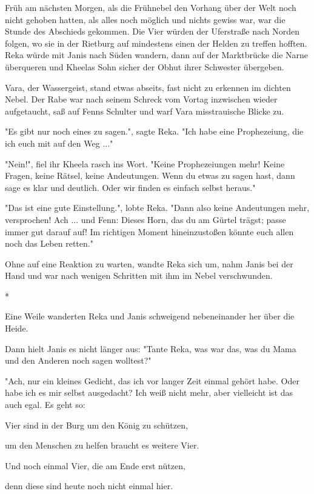\documentclass[10pt, a4paper, oneside]{book}
\begin{document}
\begin{multicols}{2}
Früh am nächsten Morgen, als die Frühnebel den Vorhang über der Welt noch 
nicht gehoben hatten, als alles noch möglich und nichts gewiss war, war die Stunde des Abschieds gekommen. Die Vier würden der Uferstraße nach Norden folgen, wo sie in der Rietburg auf mindestens einen der Helden zu treffen hofften. Reka würde mit Janis nach Süden wandern, dann auf der Marktbrücke die Narne überqueren und Kheelas Sohn sicher der Obhut ihrer Schwester übergeben. 

Vara, der Wassergeist, stand etwas abseits, fast nicht zu erkennen im dichten Nebel. Der Rabe war nach seinem Schreck vom Vortag inzwischen wieder aufgetaucht, saß auf Fenns Schulter und warf Vara misstrauische Blicke zu. 

"Es gibt nur noch eines zu sagen.", sagte Reka. "Ich habe eine Prophezeiung, die ich euch mit auf den Weg ..." 

"Nein!", fiel ihr Kheela rasch ins Wort. "Keine Prophezeiungen mehr! Keine Fragen, keine Rätsel, keine Andeutungen. Wenn du etwas zu sagen hast, dann sage es klar und deutlich. Oder wir finden es einfach selbst heraus." 

"Das ist eine gute Einstellung.", lobte Reka. "Dann also keine Andeutungen mehr, versprochen! Ach ... und Fenn: Dieses Horn, das du am Gürtel trägst; passe immer gut darauf auf! Im richtigen Moment hineinzustoßen könnte euch allen noch das Leben retten." 

Ohne auf eine Reaktion zu warten, wandte Reka sich um, nahm Janis bei der Hand und war nach wenigen Schritten mit ihm im Nebel verschwunden. 

\begin{center}
    * 
\end{center}

Eine Weile wanderten Reka und Janis schweigend nebeneinander her über die 
Heide.

Dann hielt Janis es nicht länger aus: "Tante Reka, was war das, was du Mama 
und den Anderen noch sagen wolltest?" 

"Ach, nur ein kleines Gedicht, das ich vor langer Zeit einmal gehört habe. Oder habe ich es mir selbst ausgedacht? Ich weiß nicht mehr, aber vielleicht ist das auch egal. Es geht so: 

Vier sind in der Burg um den König zu schützen,

um den Menschen zu helfen braucht es weitere Vier.

Und noch einmal Vier, die am Ende erst nützen,

denn diese sind heute noch nicht einmal hier.


\end{multicols}
\end{document}
